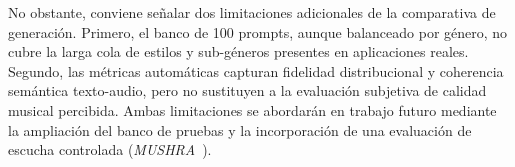 No obstante, conviene señalar dos limitaciones adicionales de la comparativa de
generación.
Primero, el banco de 100 prompts, aunque balanceado por género, no cubre la
larga cola de estilos y sub-géneros presentes en aplicaciones reales.
Segundo, las métricas automáticas capturan fidelidad distribucional y
coherencia semántica texto-audio, pero no sustituyen a la evaluación
subjetiva de calidad musical percibida.
Ambas limitaciones se abordarán en trabajo futuro mediante la ampliación del
banco de pruebas y la incorporación de una evaluación de escucha controlada
(\textit{MUSHRA}~\cite{series2014method}).

%
%
%
%
%
%
%
%
%
%
